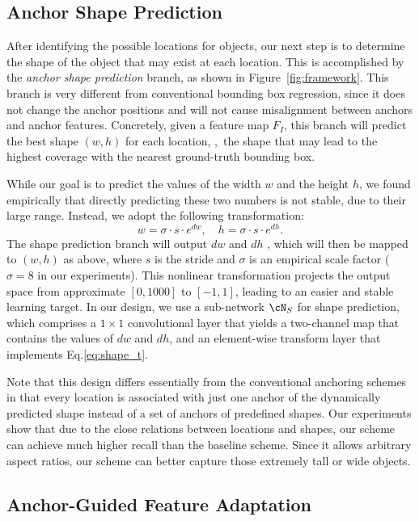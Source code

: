 \documentclass[10pt,twocolumn,letterpaper]{article}
\begin{document}
\subsection{Anchor Shape Prediction}
\label{subsec:anchor-shape}

After identifying the possible locations for objects, our next step is to determine
the shape of the object that may exist at each location.
This is accomplished by the \emph{anchor shape prediction}
branch, as shown in Figure~\ref{fig:framework}.
This branch is very different from conventional bounding box regression,
since it does not change the anchor positions and will not cause misalignment
between anchors and anchor features.
Concretely, given a feature map $F_I$, this branch will predict
the best shape $(w, h)$ for each location, \ie,~the shape that may lead to the highest coverage with the nearest ground-truth bounding box.

While our goal is to predict the values of the width $w$ and the height $h$,
we found empirically that directly predicting these two numbers is not stable,
due to their large range.
Instead, we adopt the following transformation:
\begin{equation} \label{eq:shape_t}
	w = \sigma\cdot s\cdot e^{dw}, \quad h = \sigma\cdot s\cdot e^{dh}.
\end{equation}
The shape prediction branch will output $dw$ and $dh$ , which will then be mapped
to $(w, h)$ as above, where $s$ is the stride and $\sigma$ is an empirical
scale factor ($\sigma=8$ in our experiments).
This nonlinear transformation projects the output space from approximate
$[0, 1000]$ to $[-1, 1]$, leading to an easier and stable learning target.
In our design, we use a sub-network $\cN_S$ for shape prediction, which
comprises a $1 \times 1$ convolutional layer that yields a two-channel map
that contains the values of $dw$ and $dh$, and an element-wise
transform layer that implements Eq.\eqref{eq:shape_t}.

Note that this design differs essentially from the conventional anchoring schemes
in that every location is associated with just one anchor of the dynamically predicted shape
instead of a set of anchors of predefined shapes.
Our experiments show that due to the close relations between locations and shapes,
our scheme can achieve much higher recall than the baseline scheme.
Since it allows arbitrary aspect ratios, our scheme can better capture
those extremely tall or wide objects.


\subsection{Anchor-Guided Feature Adaptation}
\label{subsec:feature-adaption}
\end{document}

